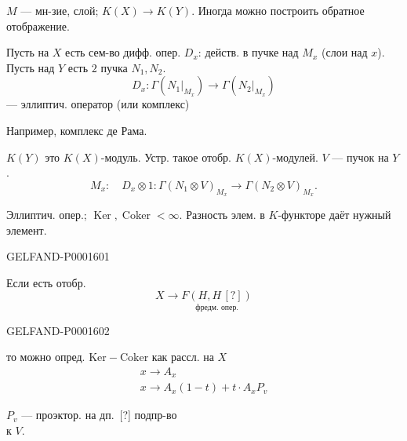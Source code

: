 $M$ — мн-зие, слой; $K(X)\longrightarrow K(Y)$.
Иногда можно построить обратное отображение.

Пусть на $X$ есть сем-во дифф. опер. $D_x$:
действ. в пучке над $M_x$ (слои над $x$).
Пусть над $Y$ есть $2$ пучка $N_1,N_2$.
\begin{equation*}
D_x:\Gamma(N_1|_{M_x})\longrightarrow\Gamma(N_2|_{M_x})
\end{equation*}
— эллиптич. оператор (или комплекс)

Например, комплекс де Рама.

$K(Y)$ это $K(X)$-модуль. Устр. такое отобр. $K(X)$-модулей.
$V$ — пучок на $Y$.
\begin{equation*}
M_x:\quad D_x\otimes1:\Gamma(N_1\otimes V)_{M_x}\longrightarrow\Gamma(N_2\otimes V)_{M_x}.
\end{equation*}

Эллиптич. опер.; $\operatorname{Ker},\operatorname{Coker}<\infty$.
Разность элем. в $K$-функторе даёт нужный элемент.



\clearpage

\begin{GelfandAdjacentEvidence}{GELFAND-P000160}{1}
\hfill{}


Если есть отобр.
\begin{equation*}
X\longrightarrow\underset{\text{фредм. опер.}}{F(H,H\, [?])}
\end{equation*}
\end{GelfandAdjacentEvidence}
\begin{GelfandAdjacentEvidence}{GELFAND-P000160}{2}

то можно опред. $\mathrm{Ker}-\mathrm{Coker}$ как рассл. на $X$
\begin{gather*}
x\longrightarrow A_x\\
x\longrightarrow A_x(1-t)+t\cdot A_xP_v
\end{gather*}
\begin{flushright}
$P_v$ — проэктор. на дп.\, [?] подпр-во\\
к $V$.
\end{flushright}
\end{GelfandAdjacentEvidence}


